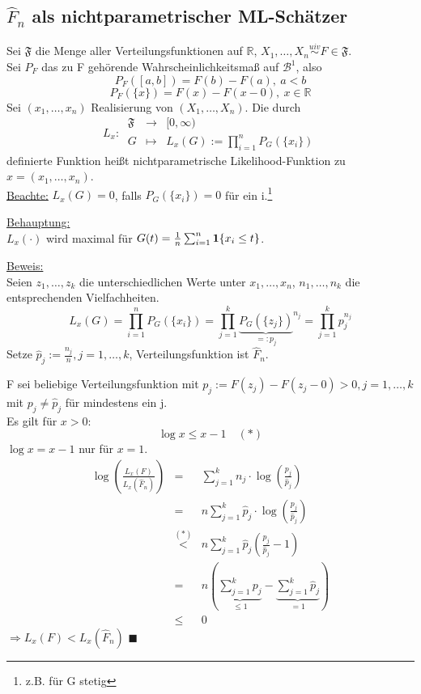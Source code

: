 \documentclass[a4paper,11pt,twoside,titlepage]{article}
\newcommand{\R}{{\mathbb R}}
\newcommand\BB{ \mathcal{B} } %
\newcommand\FF{ \mathfrak{F} }
\newcommand{\ind}{\text{\bf{1}}} %
\newcommand{\uiv}{\ensuremath{\stackrel{uiv}{\sim}}}
\begin{document}
\subsection{$\hat F_n$ als nichtparametrischer ML-Schätzer}
Sei $\FF$ die Menge aller Verteilungsfunktionen auf $\R$, $X_1,\ldots,X_n\uiv F\in\FF$.\\
Sei $P_F$ das zu F gehörende Wahrscheinlichkeitsmaß auf $\BB^1$, also
\[P_F([a,b])=F(b)-F(a),\ a<b\]
\[P_F(\{x\})=F(x)-F(x-0),\ x\in\R\]
Sei $(x_1,\ldots,x_n)$ Realisierung von $(X_1,\ldots,X_n)$. Die durch
\[L_x:\ \begin{array}{rcl}\FF&\to&[0,\infty)\\G&\mapsto&L_x(G):=\prod_{i=1}^n P_G(\{x_i\})\end{array}\]
definierte Funktion heißt nichtparametrische Likelihood-Funktion zu\\ $x=(x_1,\ldots,x_n)$.\\
\underline{Beachte:} $L_x(G)=0$, falls $P_G(\{x_i\})=0$ für ein i.\footnote{z.B. für G stetig}

\underline{Behauptung:}\\
$L_x(\cdot)$ wird maximal für $G(t)=\frac1n\sum_{i=1}^n \ind\{x_i\leq t\}$.

\underline{Beweis:}\\
Seien $z_1,\ldots,z_k$ die unterschiedlichen Werte unter $x_1,\ldots,x_n$, $n_1,\ldots,n_k$ die entsprechenden Vielfachheiten.
\[L_x(G)=\prod_{i=1}^nP_G(\{x_i\})=\prod_{j=1}^k{\underbrace{P_G(\{z_j\})}_{=:p_j}}^{n_j}=\prod_{j=1}^k p_j^{n_j}\]
Setze $\hat p_j:=\frac{n_j}{n}, j=1,\ldots,k$, Verteilungsfunktion ist $\hat F_n$.

F sei beliebige Verteilungsfunktion mit $p_j:=F(z_j)-F(z_j-0)>0, j=1,\ldots,k$ mit $p_j\neq \hat p_j$ für mindestens ein j.\\
Es gilt für $x>0$:
\[\log x\leq x-1\quad(\ast)\]
$\log x=x-1$ nur für $x=1$.
\begin{eqnarray*}
\log\left(\frac{L_x(F)}{L_x(\hat F_n)}\right)&=&\sum_{j=1}^k n_j\cdot\log(\frac{p_j}{\hat p_j})\\
&=&n\sum_{j=1}^k \hat p_j\cdot \log(\frac{p_j}{\hat p_j})\\
&\stackrel{(\ast)}{<}&n\sum_{j=1}^k\hat p_j(\frac{p_j}{\hat p_j}-1)\\
&=&n(\underbrace{\sum_{j=1}^kp_j}_{\leq 1}-\underbrace{\sum_{j=1}^k\hat p_j}_{=1})\\
&\leq&0\end{eqnarray*}
$\Rightarrow L_x(F)<L_x(\hat F_n)$ $\blacksquare$
\end{document}
